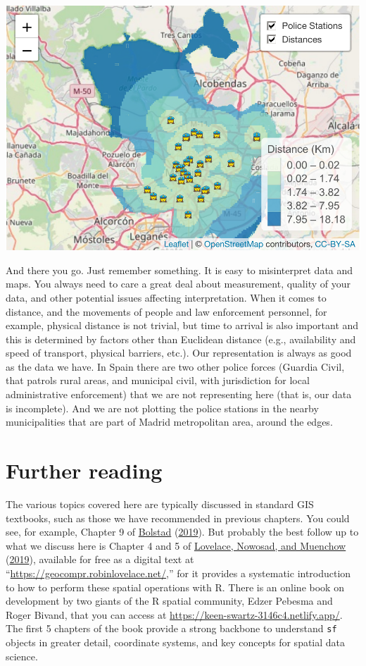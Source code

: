 \documentclass[
]{book}
\begin{document}
\includegraphics{crime_mapping_files/figure-latex/unnamed-chunk-74-1.pdf}

And there you go. Just remember something. It is easy to misinterpret data and maps. You always need to care a great deal about measurement, quality of your data, and other potential issues affecting interpretation. When it comes to distance, and the movements of people and law enforcement personnel, for example, physical distance is not trivial, but time to arrival is also important and this is determined by factors other than Euclidean distance (e.g., availability and speed of transport, physical barriers, etc.). Our representation is always as good as the data we have. In Spain there are two other police forces (Guardia Civil, that patrols rural areas, and municipal civil, with jurisdiction for local administrative enforcement) that we are not representing here (that is, our data is incomplete). And we are not plotting the police stations in the nearby municipalities that are part of Madrid metropolitan area, around the edges.

\hypertarget{further-reading}{%
\section{Further reading}\label{further-reading}}

The various topics covered here are typically discussed in standard GIS textbooks, such as those we have recommended in previous chapters. You could see, for example, Chapter 9 of \protect\hyperlink{ref-Bolstad_2019}{Bolstad} (\protect\hyperlink{ref-Bolstad_2019}{2019}). But probably the best follow up to what we discuss here is Chapter 4 and 5 of \protect\hyperlink{ref-Lovelace_2019}{Lovelace, Nowosad, and Muenchow} (\protect\hyperlink{ref-Lovelace_2019}{2019}), available for free as a digital text at ``\url{https://geocompr.robinlovelace.net/},'' for it provides a systematic introduction to how to perform these spatial operations with R. There is an online book on development by two giants of the R spatial community, Edzer Pebesma and Roger Bivand, that you can access at \url{https://keen-swartz-3146c4.netlify.app/}. The first 5 chapters of the book provide a strong backbone to understand \texttt{sf} objects in greater detail, coordinate systems, and key concepts for spatial data science.
\end{document}
